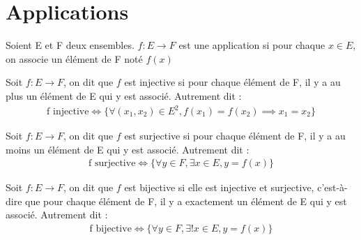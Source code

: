 \section{Applications}

\begin{graybox}
	\begin{definition}[Application]
		Soient E et F deux ensembles. $f:E \to F$ est une application si pour chaque $x \in E$, on associe un élément de F noté $f(x)$
	\end{definition}
\end{graybox}

\begin{graybox}
	\begin{definition}[Injectivité]
		Soit $f:E \to F$, on dit que $f$ est injective si pour chaque élément de F, il y a au plus un élément de E qui y est associé. Autrement dit :
		\begin{align*}
			\text{f injective} \iff \{\forall (x_1, x_2) \in E^2, f(x_1) = f(x_2) \implies x_1 = x_2\}	
		\end{align*}
	\end{definition}
\end{graybox}

    \begin{graybox}
    	\begin{definition}[Surjectivité]
    		Soit $f:E \to F$, on dit que $f$ est surjective si pour chaque élément de F, il y a au moins un élément de E qui y est associé.
    		Autrement dit :
    		\begin{align*}
    			\text{f surjective} \iff \{\forall y \in F, \exists x \in E, y = f(x)\}	
    		\end{align*}
    	\end{definition}
    \end{graybox}

    \begin{graybox}
    	\begin{definition}[Bijectivité]
    		Soit $f:E \to F$, on dit que $f$ est bijective si elle est injective et surjective, c'est-à-dire que pour chaque élément de F, il y a exactement un élément de E qui y est associé.
    		Autrement dit :
    		\begin{align*}
    			\text{f bijective} \iff \{\forall y \in F, \exists! x \in E, y = f(x)\}	
    		\end{align*}
    	\end{definition}
    \end{graybox}

